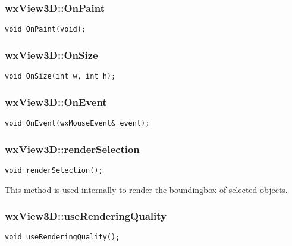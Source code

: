 \documentclass[12pt]{article}
\begin{document}
\subsubsection*{wxView3D::OnPaint}
\vspace{-0.65cm}
\hrulefill
{}
\begin{flushleft}
\texttt{void OnPaint(void);}
\end{flushleft}



\subsubsection*{wxView3D::OnSize}
\vspace{-0.65cm}
\hrulefill
{}
\begin{flushleft}
\texttt{void OnSize(int w, int h);}
\end{flushleft}



\subsubsection*{wxView3D::OnEvent}
\vspace{-0.65cm}
\hrulefill
{}
\begin{flushleft}
\texttt{void OnEvent(wxMouseEvent\& event);}
\end{flushleft}



\subsubsection*{wxView3D::renderSelection}
\vspace{-0.65cm}
\hrulefill
{}
\begin{flushleft}
\texttt{void renderSelection();}
\end{flushleft}

This method is used internally to render the boundingbox of selected objects.


\subsubsection*{wxView3D::useRenderingQuality}
\vspace{-0.65cm}
\hrulefill
{}
\begin{flushleft}
\texttt{void useRenderingQuality();}
\end{flushleft}
\end{document}
